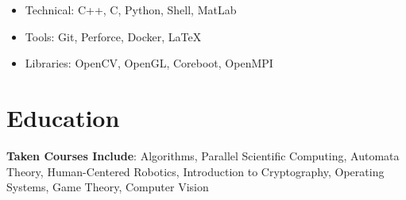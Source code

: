 \documentclass{Custom_CV}
\begin{document}
\begin{itemize}[noitemsep]
\item Technical: C++, C, Python, Shell, MatLab
\item Tools: Git, Perforce, Docker, \LaTeX
\item Libraries: OpenCV, OpenGL, Coreboot, OpenMPI
\end{itemize}

\section{Education}

\textbf{Taken Courses Include}:
Algorithms, Parallel Scientific Computing, Automata Theory, Human-Centered Robotics, Introduction to Cryptography, Operating Systems, Game Theory, Computer Vision








\end{document}
